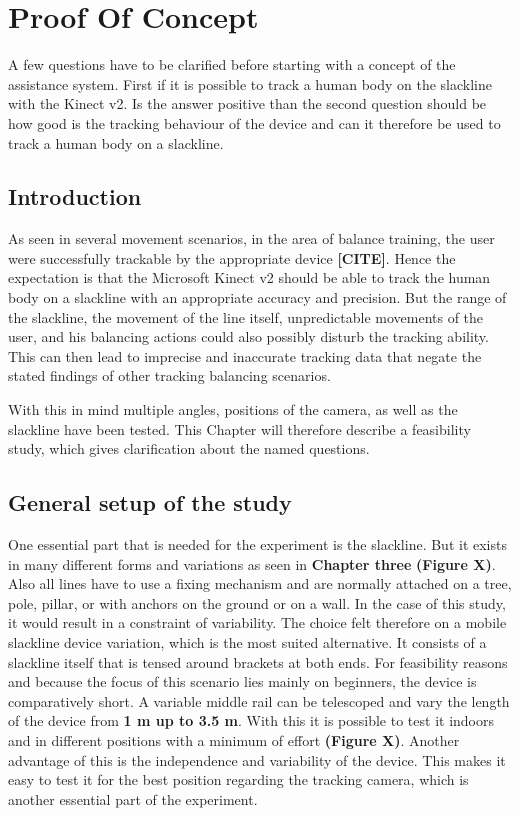 \section{Proof Of Concept}\label{3_3_proofOfConcept}

A few questions have to be clarified before starting with a concept of the assistance system. First if it is possible to track a human body on the slackline with the Kinect v2. Is the answer positive than the second question should be how good is the tracking behaviour of the device and can it therefore be used to track a human body on a slackline.

\subsection{Introduction}
As seen in several movement scenarios, in the area of balance training, the user were successfully trackable by the appropriate device \textbf{[CITE]}. Hence the expectation is that the Microsoft Kinect v2 should be able to track the human body on a slackline with an appropriate accuracy and precision. But the range of the slackline, the movement of the line itself, unpredictable movements of the user, and his balancing actions could also possibly disturb the tracking ability. This can then lead to imprecise and inaccurate tracking data that negate the stated findings of other tracking balancing scenarios.

With this in mind multiple angles, positions of the camera, as well as the slackline have been tested. This Chapter will therefore describe a feasibility study, which gives clarification about the named questions. 

\subsection{General setup of the study} %
One essential part that is needed for the experiment is the slackline. But it exists in many different forms and variations as seen in \textbf{Chapter three} \textbf{ (Figure X)}. Also all lines have to use a fixing mechanism and are normally attached on a tree, pole, pillar, or with anchors on the ground or on a wall. In the case of this study, it would result in a constraint of variability. 
The choice felt therefore on a mobile slackline device variation, which is the most suited alternative. It consists of a slackline itself that is tensed around brackets at both ends. For feasibility reasons and because the focus of this scenario lies mainly on beginners, the device is comparatively short. A variable middle rail can be telescoped and vary the length of the device from \textbf{1 m up to 3.5 m}. With this it is possible to test it indoors and in different positions with a minimum of effort \textbf{(Figure X)}. Another advantage of this is the independence and variability of the device. This makes it easy to test it for the best position regarding the tracking camera, which is another essential part of the experiment.

